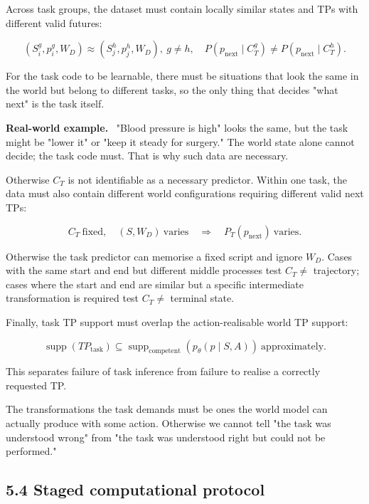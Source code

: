 \documentclass[11pt]{article}
\newenvironment{plainword}{%
  \par\medskip\noindent\begin{minipage}{\textwidth}%
  \color{gray!75!black}\small\itshape
}{%
  \end{minipage}\par\medskip}
\newenvironment{example}{%
  \par\smallskip\noindent\begin{minipage}{\textwidth}%
  \color{teal!60!black}\small
  \textbf{\color{teal!70!black}Real-world example.}\
}{%
  \end{minipage}\par\smallskip}
\begin{document}
Across task groups, the dataset must contain locally similar states and TPs with different valid futures:

\[
\boxed{
(S_i^g,p_i^g,W_D)\approx(S_j^h,p_j^h,W_D),\ g\neq h,
\quad
P(p_{\mathrm{next}}\mid C_T^g)
\neq P(p_{\mathrm{next}}\mid C_T^h).}
\]

\begin{plainword}
For the task code to be learnable, there must be situations that look the same in the world but belong to different tasks, so the
only thing that decides "what next" is the task itself.
\end{plainword}

\begin{example}
"Blood pressure is high" looks the same, but the task might be "lower it" or "keep it steady for surgery." The world state alone
cannot decide; the task code must. That is why such data are necessary.
\end{example}

Otherwise $C_T$ is not identifiable as a necessary predictor. Within one task, the data must also contain different world
configurations requiring different valid next TPs:

\[
\boxed{
C_T\ \text{fixed},\quad (S,W_D)\ \text{varies}
\quad\Rightarrow\quad
P_T(p_{\mathrm{next}})\ \text{varies}.}
\]

Otherwise the task predictor can memorise a fixed script and ignore $W_D$. Cases with the same start and end but different middle
processes test $C_T\neq$ trajectory; cases where the start and end are similar but a specific intermediate transformation is
required test $C_T\neq$ terminal state.

Finally, task TP support must overlap the action-realisable world TP support:

\[
\boxed{
\operatorname{supp}(TP_{\mathrm{task}})
\subseteq\operatorname{supp}_{\mathrm{competent}}(p_\theta(p\mid S,A))
\ \text{approximately}.}
\]

This separates failure of task inference from failure to realise a correctly requested TP.

\begin{plainword}
The transformations the task demands must be ones the world model can actually produce with some action. Otherwise we cannot tell
"the task was understood wrong" from "the task was understood right but could not be performed."
\end{plainword}

\subsection*{5.4 Staged computational protocol}
\end{document}
